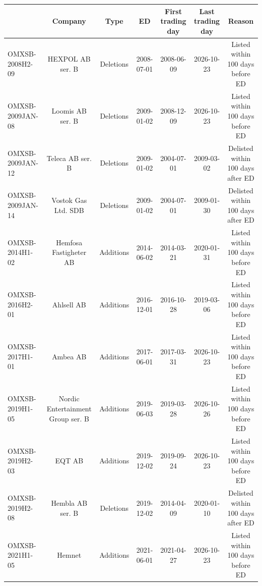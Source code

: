 \begin{threeparttable}
\begingroup
\renewcommand\cellalign{t}
\renewcommand\arraystretch{1}
\setlength{\tabcolsep}{5pt}
\begin{tabular}{@{}lcccccc}
\toprule
 & Company & Type & ED & First trading day & Last trading day & Reason \\
\midrule
\addlinespace[1ex]
OMXSB-2008H2-09 & HEXPOL AB ser. B & Deletions & 2008-07-01 & 2008-06-09 & 2026-10-23 & Listed within 100 days before ED \\
\addlinespace[0.25ex]
\addlinespace[0.25ex]
OMXSB-2009JAN-08 & Loomis AB ser. B & Deletions & 2009-01-02 & 2008-12-09 & 2026-10-23 & Listed within 100 days before ED \\
\addlinespace[0.25ex]
\addlinespace[0.25ex]
OMXSB-2009JAN-12 & Teleca AB ser. B & Deletions & 2009-01-02 & 2004-07-01 & 2009-03-02 & Delisted within 100 days after ED \\
\addlinespace[0.25ex]
\addlinespace[0.25ex]
OMXSB-2009JAN-14 & Vostok Gas Ltd. SDB & Deletions & 2009-01-02 & 2004-07-01 & 2009-01-30 & Delisted within 100 days after ED \\
\addlinespace[0.25ex]
\addlinespace[0.25ex]
OMXSB-2014H1-02 & Hemfosa Fastigheter AB & Additions & 2014-06-02 & 2014-03-21 & 2020-01-31 & Listed within 100 days before ED \\
\addlinespace[0.25ex]
\addlinespace[0.25ex]
OMXSB-2016H2-01 & Ahlsell AB & Additions & 2016-12-01 & 2016-10-28 & 2019-03-06 & Listed within 100 days before ED \\
\addlinespace[0.25ex]
\addlinespace[0.25ex]
OMXSB-2017H1-01 & Ambea AB & Additions & 2017-06-01 & 2017-03-31 & 2026-10-23 & Listed within 100 days before ED \\
\addlinespace[0.25ex]
\addlinespace[0.25ex]
OMXSB-2019H1-05 & Nordic Entertainment Group ser. B & Additions & 2019-06-03 & 2019-03-28 & 2026-10-26 & Listed within 100 days before ED \\
\addlinespace[0.25ex]
\addlinespace[0.25ex]
OMXSB-2019H2-03 & EQT AB & Additions & 2019-12-02 & 2019-09-24 & 2026-10-23 & Listed within 100 days before ED \\
\addlinespace[0.25ex]
\addlinespace[0.25ex]
OMXSB-2019H2-08 & Hembla AB ser. B & Deletions & 2019-12-02 & 2014-04-09 & 2020-01-10 & Delisted within 100 days after ED \\
\addlinespace[0.25ex]
\addlinespace[0.25ex]
OMXSB-2021H1-05 & Hemnet & Additions & 2021-06-01 & 2021-04-27 & 2026-10-23 & Listed within 100 days before ED \\

\end{tabular}
\end{threeparttable}
